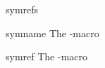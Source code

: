 \documentclass{stex}
\begin{document}
  \begin{smodule}[title=Referencing \sns{symbol}]{symrefs}
  
  \begin{sfunction}{symname}{\symname}
    The \dcs-macro
  \end{sfunction}

  \begin{sfunction}{symref}{\symref}
    The \dcs-macro
  \end{sfunction}
   
  \end{smodule}
\end{document}
